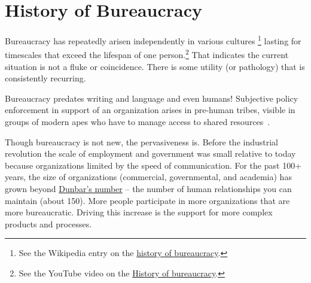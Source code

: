 \section{History of Bureaucracy\label{sec:history}}


Bureaucracy has repeatedly arisen independently in various cultures
\footnote{See the Wikipedia entry on the \href{https://en.wikipedia.org/wiki/Bureaucracy\%23History}{history of bureaucracy}.
}
lasting for timescales that exceed the lifespan of one person.\footnote{See the YouTube video on the \href{https://www.youtube.com/watch?v=B_nsZlcC12g}{History of bureaucracy}.} That indicates the current situation is not a fluke or coincidence. There is some utility (or pathology) that is consistently recurring. 


Bureaucracy predates writing and language and even humans! Subjective policy enforcement in support of an organization arises in pre-human tribes, visible in groups of modern apes who have to manage access to shared resources~\cite{2016_Suchak}. 



Though bureaucracy is not new, the pervasiveness is. Before the industrial revolution the scale of employment and government was small relative to today because organizations limited by the speed of communication. For the past 100+ years, the size of organizations (commercial, governmental, and academia) has grown beyond \href{https://en.wikipedia.org/wiki/Dunbar\%27s_number}{Dunbar's number} -- the number of human relationships you can maintain (about 150). \iftoggle{WPinmargin}{\marginpar{[Wikipedia] Dunbar's\\number}}{}
More people participate in more organizations that are more bureaucratic. Driving this increase is the support for more complex products and processes. 



